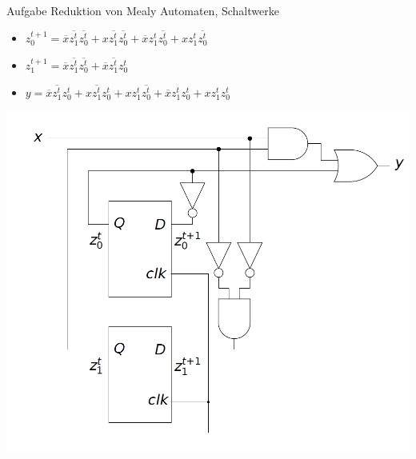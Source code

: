     \begin{frame}{Aufgabe \thesection}{Reduktion von Mealy Automaten, Schaltwerke}
      \begin{solution}
        \begin{itemize}
          \item $z_0^{t+1} = \overline{x}\overline{z_1^t}\overline{z_0^t} +  x\overline{z_1^t}\overline{z_0^t} + \overline{x}z_1^t\overline{z_0^t} + xz_1^t\overline{z_0^t}$
          \item $z_1^{t+1} = \overline{x}\overline{z_1^t}\overline{z_0^t} + \overline{x}\overline{z_1^t}z_0^t$
          \item $y         = \overline{x}\overline{z_1^t}z_0^t + x\overline{z_1^t}z_0^t + xz_1^t\overline{z_0^t} + \overline{x}z_1^tz_0^t + xz_1^tz_0^t$
        \end{itemize}
        \includegraphics[height=0.5\paperheight, center]{./figures/Mealy-reduziert-Schaltwerk.png}
      \end{solution}
    \end{frame}
